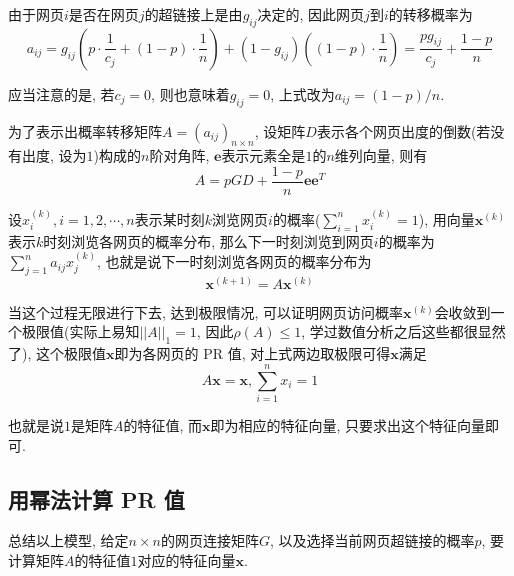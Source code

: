 \documentclass[a4paper,UTF8]{ctexart}
\theoremstyle{plain} \newtheorem{theorem}{定理}[section]
\theoremstyle{plain} \newtheorem{definition}{定义}[section]
\theoremstyle{plain} \newtheorem{lemma}{引理}[section]
\theoremstyle{plain} \newtheorem{proposition}{命题}[section]
\theoremstyle{plain} \newtheorem{example}{例}[section]
\theoremstyle{plain} \newtheorem{remark}{注}[section]
\theoremstyle{plain} \newtheorem{corollary}{推论}[section]
\begin{document}
由于网页$i$是否在网页$j$的超链接上是由$g_{ij}$决定的, 因此网页$j$到$i$的转移概率为
\begin{equation*}
a_{ij} = g_{ij} \left( p \cdot \frac{1}{c_j} + (1 - p) \cdot \frac{1}{n} \right) + (1 - g_{ij}) \left( (1 - p) \cdot \frac{1}{n} \right) = \frac{p g_{ij}}{c_j} + \frac{1 - p}{n}
\end{equation*}

应当注意的是, 若$c_{j} = 0$, 则也意味着$g_{ij} = 0$, 上式改为$a_{ij} = (1 - p) / n$.

为了表示出概率转移矩阵$A = (a_{ij})_{n \times n}$, 设矩阵$D$表示各个网页出度的倒数(若没有出度, 设为$1$)构成的$n$阶对角阵, $\bm{e}$表示元素全是$1$的$n$维列向量, 则有
\begin{equation*}
A = p G D + \frac{1 - p}{n} \bm{e} \bm{e}^{T}
\end{equation*}

设$x_{i}^{(k)}, i = 1,2,\cdots,n$表示某时刻$k$浏览网页$i$的概率($\sum_{i=1}^{n} x_{i}^{(k)} = 1$), 用向量$\bm{x}^{(k)}$表示$k$时刻浏览各网页的概率分布, 那么下一时刻浏览到网页$i$的概率为$\sum_{j=1}^{n} a_{ij} x_{j}^{(k)}$, 也就是说下一时刻浏览各网页的概率分布为
\begin{equation*}
\bm{x}^{(k+1)} = A \bm{x}^{(k)}
\end{equation*}

当这个过程无限进行下去, 达到极限情况, 可以证明网页访问概率$\bm{x}^{(k)}$会收敛到一个极限值(实际上易知$||A||_{1} = 1$, 因此$\rho (A) \leqslant 1$, 学过数值分析之后这些都很显然了), 这个极限值$\bm{x}$即为各网页的 PR 值, 对上式两边取极限可得$\bm{x}$满足
\begin{equation*}
A \bm{x} = \bm{x}, \sum_{i=1}^{n} x_i = 1
\end{equation*}

也就是说$1$是矩阵$A$的特征值, 而$\bm{x}$即为相应的特征向量, 只要求出这个特征向量即可.


\subsection{用幂法计算 PR 值}
总结以上模型, 给定$n \times n$的网页连接矩阵$G$, 以及选择当前网页超链接的概率$p$, 要计算矩阵$A$的特征值$1$对应的特征向量$\bm{x}$.
\end{document}
